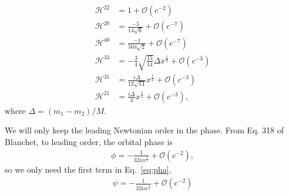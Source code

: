 \documentclass[aps,prd,amsmath,showpacs,amssymb,superscriptaddress,nofootinbib,longbibliography,eqsecnum,preprintnumbers]{revtex4-1}
\begin{document}
\begin{align}
\mathcal{H}^{22}&=1 +\mathcal{O}(c^{-2}) \nonumber \\
\mathcal{H}^{20}&=\frac{-5}{14\sqrt{6}} +\mathcal{O}(c^{-7}) \nonumber \\
\mathcal{H}^{40}&=\frac{-1}{504\sqrt{2}} +\mathcal{O}(c^{-7}) \nonumber \\
\mathcal{H}^{33}&=-\frac{3}{4}\sqrt{\frac{15}{14}}\Delta x^{\frac{1}{2}} +\mathcal{O}(c^{-3}) \nonumber \\
\mathcal{H}^{31}&=\frac{i\Delta}{12\sqrt{14}}x^{\frac{1}{2}} +\mathcal{O}(c^{-3}) \nonumber \\
\mathcal{H}^{21}&=\frac{i\Delta}{3}x^{\frac{1}{2}} +\mathcal{O}(c^{-3}), \label{eq:H}
\end{align}
where $\Delta =(m_1-m_2)/M$.

We will only keep the leading Newtonian order in the phase. From Eq. 318 of Blanchet, to leading order, the orbital phase is
\begin{align}
\phi=-\frac{1}{32 \nu x^{\frac{5}{2}}}+\mathcal{O}(c^{-2}),
\end{align}
so we only need the first term in Eq.~\eqref{eq:pha},
\begin{align}
\psi=-\frac{1}{32 \nu x^{\frac{5}{2}}}+\mathcal{O}(c^{-2})
\end{align}
\end{document}
